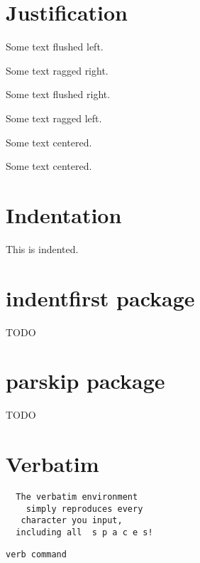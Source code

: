 \documentclass{article}
\begin{document}
  \section{Justification}

  \begin{flushleft}Some text flushed left.\end{flushleft}

  {\raggedright{}Some text ragged right.}

  \begin{flushright}Some text flushed right.\end{flushright}

  {\raggedleft{}Some text ragged left.}

  \begin{center}
    Some text centered.
  \end{center}

  {\centering{}Some text centered.}

  \section{Indentation}

  \indent This is indented.

  \section{indentfirst package}
  TODO

  \section{parskip package}
  TODO

  \section{Verbatim}

  \begin{verbatim}
  The verbatim environment
    simply reproduces every
   character you input,
  including all  s p a c e s!
  \end{verbatim}

  \verb+verb command+
\end{document}
